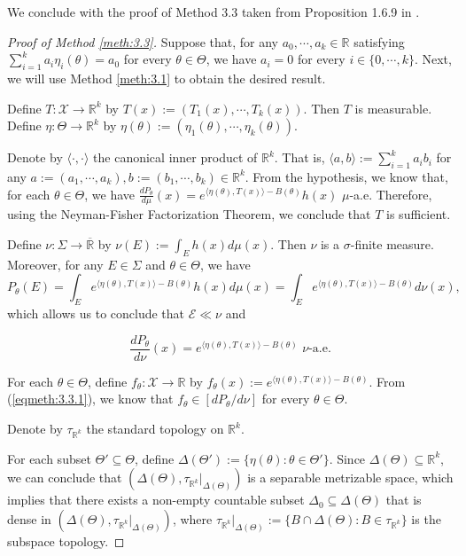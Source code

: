 \documentclass[12pt]{article}
\begin{document}
We conclude with the proof of Method 3.3 taken from Proposition 1.6.9 in \cite{Pfanzagl1994}.

\begin{proof}[Proof of Method \ref{meth:3.3}]
Suppose that, for any $a_0,\cdots,a_k\in\mathbb{R}$ satisfying $\sum _{i=1}^ka_i\eta_i (\theta )=a_0$ for every $\theta\in\Theta$, we have $a_i=0$ for every $i\in \{0,\cdots ,k\}$. Next, we will use Method \ref{meth:3.1} to obtain the desired result.

Define $T:\mathcal{X}\to \mathbb{R}^k$ by $T(x):=(T_1(x),\cdots, T_k(x))$. Then $T$ is measurable. Define $\eta :\Theta \to \mathbb{R}^k$ by $\eta (\theta ):=(\eta _1(\theta ),\cdots,\eta _k(\theta ))$.

Denote by $\langle \cdot ,\cdot \rangle $ the canonical inner product of $\mathbb{R}^k$. That is, $\langle a,b\rangle :=\sum _{i=1}^ka_ib_i$ for any $a:=(a_1,\cdots, a_k),b:=(b_1,\cdots,b_k)\in\mathbb{R}^k$. From the hypothesis, we know that, for each $\theta\in\Theta$, we have $\frac{dP_\theta }{d\mu }(x)=e^{\langle \eta (\theta ),T(x)\rangle -B(\theta )}h(x)$ $\mu$-a.e. Therefore, using the Neyman-Fisher Factorization Theorem, we conclude that $T$ is sufficient.

Define $\nu :\Sigma \to \overline {\mathbb{R}}$ by $\nu (E):=\int _Eh(x)d\mu (x)$. Then $\nu$ is a $\sigma$-finite measure. Moreover, for any $E\in \Sigma$ and $\theta\in\Theta$, we have $$P_\theta (E)=\int _Ee^{\langle \eta (\theta ),T(x)\rangle -B(\theta )}h(x)d\mu (x)=\int _Ee^{\langle \eta (\theta ),T(x)\rangle-B(\theta )}d\nu (x),$$ which allows us to conclude that $\mathcal{E}\ll \nu$ and 

\begin{equation}
\label{eqmeth:3.3.1}
\frac{dP_\theta }{d\nu }(x)=e^{\langle \eta (\theta ),T(x)\rangle -B(\theta )}\,\,\nu\text{-a.e.}
\end{equation}

For each $\theta\in\Theta$, define $f_\theta :\mathcal{X}\to \mathbb{R}$ by $f_\theta (x):=e^{\langle\eta (\theta),T(x)\rangle -B(\theta ) }$. From (\ref{eqmeth:3.3.1}), we know that $f_\theta \in [dP_\theta/d\nu ]$ for every $\theta\in\Theta$.

Denote by $\tau _{\mathbb{R}^k}$ the standard topology on $\mathbb{R}^k$.

For each subset $\Theta'\subseteq\Theta $, define $\Delta (\Theta '):=\{\eta (\theta ):\theta\in\Theta '\}$. Since $\Delta (\Theta )\subseteq \mathbb{R}^k$, we can conclude that $(\Delta (\Theta ), \tau _{\mathbb{R}^k}|_{\Delta (\Theta )})$ is a separable metrizable space, which implies that there exists a non-empty countable subset $\Delta _0\subseteq\Delta (\Theta )$ that is dense in $(\Delta (\Theta ), \tau _{\mathbb{R}^k}|_{\Delta (\Theta )})$, where $\tau _{\mathbb{R}^k}|_{\Delta (\Theta )}:=\{B\cap\Delta (\Theta ):B\in \tau _{\mathbb{R}^k}\}$ is the subspace topology.


\end{proof}
\end{document}
